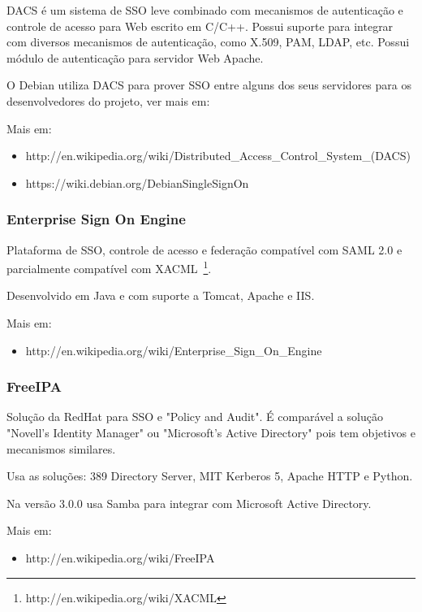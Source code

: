 \documentclass[11pt]{article}
\begin{document}
DACS é um sistema de SSO leve combinado com mecanismos de autenticação e
controle de acesso para Web escrito em C/C++. Possui suporte para integrar com
diversos mecanismos de autenticação, como X.509, PAM, LDAP, etc. Possui módulo
de autenticação para servidor Web Apache.


O Debian utiliza DACS para prover SSO entre alguns dos seus servidores para os
desenvolvedores do projeto, ver mais em:

Mais em:
\begin{itemize}
  \item{http://en.wikipedia.org/wiki/Distributed\_Access\_Control\_System\_(DACS)}
  \item{https://wiki.debian.org/DebianSingleSignOn}
\end{itemize}

\subsubsection{Enterprise Sign On Engine}

Plataforma de SSO, controle de acesso e federação compatível com SAML 2.0
e parcialmente compatível com
XACML~\footnote{http://en.wikipedia.org/wiki/XACML}.

Desenvolvido em Java e com suporte a Tomcat, Apache e IIS.

Mais em:
\begin{itemize}
  \item{http://en.wikipedia.org/wiki/Enterprise\_Sign\_On\_Engine}
\end{itemize}

\subsubsection{FreeIPA}

Solução da RedHat para SSO e "Policy and Audit". É comparável a solução
"Novell's Identity Manager" ou "Microsoft's Active Directory" pois tem
objetivos e mecanismos similares.

Usa as soluções: 389 Directory Server, MIT Kerberos 5, Apache HTTP e Python.

Na versão 3.0.0 usa Samba para integrar com Microsoft Active Directory.

Mais em:
\begin{itemize}
  \item{http://en.wikipedia.org/wiki/FreeIPA}
\end{itemize}
\end{document}
